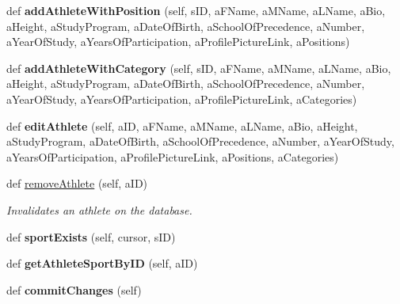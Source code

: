 \begin{DoxyCompactItemize}
\mbox{\label{classathlete__dao_1_1_athlete_d_a_o_a482243cb0b8af8284dafd6420472d5aa}} 
def {\bfseries add\+Athlete\+With\+Position} (self, s\+ID, a\+F\+Name, a\+M\+Name, a\+L\+Name, a\+Bio, a\+Height, a\+Study\+Program, a\+Date\+Of\+Birth, a\+School\+Of\+Precedence, a\+Number, a\+Year\+Of\+Study, a\+Years\+Of\+Participation, a\+Profile\+Picture\+Link, a\+Positions)
\item 
\mbox{\label{classathlete__dao_1_1_athlete_d_a_o_a37e2fb7f0b81bd41251857361ebdc61c}} 
def {\bfseries add\+Athlete\+With\+Category} (self, s\+ID, a\+F\+Name, a\+M\+Name, a\+L\+Name, a\+Bio, a\+Height, a\+Study\+Program, a\+Date\+Of\+Birth, a\+School\+Of\+Precedence, a\+Number, a\+Year\+Of\+Study, a\+Years\+Of\+Participation, a\+Profile\+Picture\+Link, a\+Categories)
\item 
\mbox{\label{classathlete__dao_1_1_athlete_d_a_o_ae368a330b832232d2af16ca519176d94}} 
def {\bfseries edit\+Athlete} (self, a\+ID, a\+F\+Name, a\+M\+Name, a\+L\+Name, a\+Bio, a\+Height, a\+Study\+Program, a\+Date\+Of\+Birth, a\+School\+Of\+Precedence, a\+Number, a\+Year\+Of\+Study, a\+Years\+Of\+Participation, a\+Profile\+Picture\+Link, a\+Positions, a\+Categories)
\item 
def \hyperlink{classathlete__dao_1_1_athlete_d_a_o_aa767760f11043bd9307ad55f0610ea1d}{remove\+Athlete} (self, a\+ID)
\begin{DoxyCompactList}\small\item\em Invalidates an athlete on the database. \end{DoxyCompactList}\item 
\mbox{\label{classathlete__dao_1_1_athlete_d_a_o_a7578844e879411efd78128b67f5afd13}} 
def {\bfseries sport\+Exists} (self, cursor, s\+ID)
\item 
\mbox{\label{classathlete__dao_1_1_athlete_d_a_o_a41271289fbd0ffe6a279704a2acfc45d}} 
def {\bfseries get\+Athlete\+Sport\+By\+ID} (self, a\+ID)
\item 
\mbox{\label{classathlete__dao_1_1_athlete_d_a_o_a4e6cc4e43a3b4458be76a84859192c5e}} 
def {\bfseries commit\+Changes} (self)
\end{DoxyCompactItemize}
